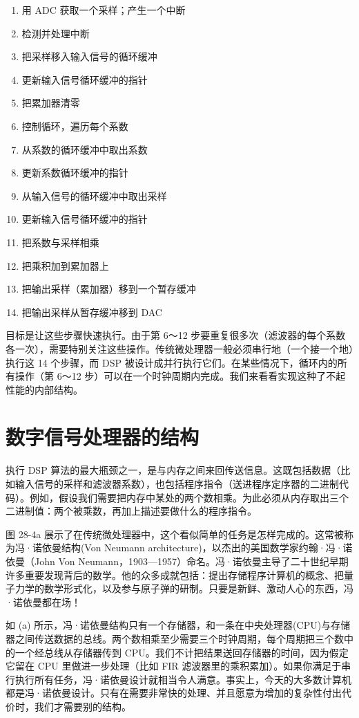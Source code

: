 \begin{enumerate}
\def\labelenumi{\arabic{enumi}.}
\tightlist
\item
  用 ADC 获取一个采样；产生一个中断
\item
  检测并处理中断
\item
  把采样移入输入信号的循环缓冲
\item
  更新输入信号循环缓冲的指针
\item
  把累加器清零
\item
  控制循环，遍历每个系数
\item
  从系数的循环缓冲中取出系数
\item
  更新系数循环缓冲的指针
\item
  从输入信号的循环缓冲中取出采样
\item
  更新输入信号循环缓冲的指针
\item
  把系数与采样相乘
\item
  把乘积加到累加器上
\item
  把输出采样（累加器）移到一个暂存缓冲
\item
  把输出采样从暂存缓冲移到 DAC
\end{enumerate}

目标是让这些步骤快速执行。由于第 6～12
步要重复很多次（滤波器的每个系数各一次），需要特别关注这些操作。传统微处理器一般必须串行地（一个接一个地）执行这
14 个步骤，而 DSP
被设计成并行执行它们。在某些情况下，循环内的所有操作（第 6～12
步）可以在一个时钟周期内完成。我们来看看实现这种了不起性能的内部结构。

\section{数字信号处理器的结构}

执行 DSP
算法的最大瓶颈之一，是与内存之间来回传送信息。这既包括数据（比如输入信号的采样和滤波器系数），也包括程序指令（送进程序定序器的二进制代码）。例如，假设我们需要把内存中某处的两个数相乘。为此必须从内存取出三个二进制值：两个被乘数，再加上描述要做什么的程序指令。

图 28-4a
展示了在传统微处理器中，这个看似简单的任务是怎样完成的。这常被称为冯·诺依曼结构(Von
Neumann architecture)，以杰出的美国数学家约翰·冯·诺依曼（John Von
Neumann，1903---1957）命名。冯·诺依曼主导了二十世纪早期许多重要发现背后的数学。他的众多成就包括：提出存储程序计算机的概念、把量子力学的数学形式化，以及参与原子弹的研制。只要是新鲜、激动人心的东西，冯·诺依曼都在场！

如 (a)
所示，冯·诺依曼结构只有一个存储器，和一条在中央处理器(CPU)与存储器之间传送数据的总线。两个数相乘至少需要三个时钟周期，每个周期把三个数中的一个经总线从存储器传到
CPU。我们不计把结果送回存储器的时间，因为假定它留在 CPU
里做进一步处理（比如 FIR
滤波器里的乘积累加）。如果你满足于串行执行所有任务，冯·诺依曼设计就相当令人满意。事实上，今天的大多数计算机都是冯·诺依曼设计。只有在需要非常快的处理、并且愿意为增加的复杂性付出代价时，我们才需要别的结构。

